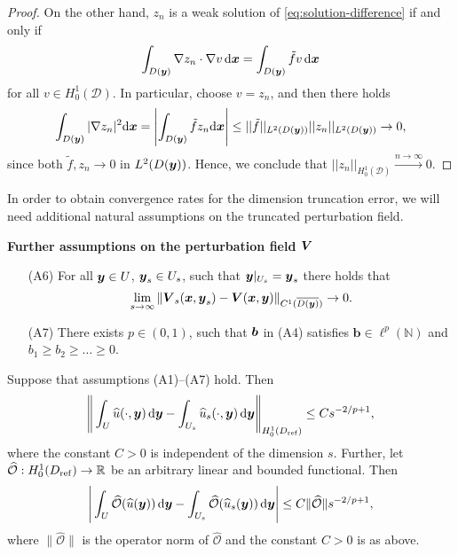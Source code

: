 \documentclass[graybox]{svmult}
\begin{document}
\begin{proof}
    On the other hand, $z_n$ is a weak solution of \eqref{eq:solution-difference} if and only if
    $$
        \int_{D({\boldsymbol{y}})} \nabla z_n\cdot \nabla v \,{\rm d}{\boldsymbol{x}}= \int_{D({\boldsymbol{y}})} \tilde{f} v\,{\rm d}{\boldsymbol{x}}
    $$
    for all $v \in H_0^1(\mathscr D)$. In particular, choose $v = z_n$, and then there holds
    $$
        \int_{D({\boldsymbol{y}})} |\nabla z_n|^2 {\rm d}{\boldsymbol{x}} = \left| \int_{D({\boldsymbol{y}})} \tilde{f} z_n {\rm d}{\boldsymbol{x}} \right|  \leq || \tilde{f} ||_{L^2(D({\boldsymbol{y}}))} || z_n ||_{L^2(D({\boldsymbol{y}}))} \to 0,
    $$
    since both $\tilde{f}, z_n \to 0$ in $L^2(D({\boldsymbol{y}}))$. Hence, we conclude that $||z_n||_{H_0^1(\mathscr D)} \xrightarrow[]{n \to \infty} 0$.
\end{proof}

In order to obtain convergence rates for the dimension truncation error, we will need additional natural assumptions on the truncated perturbation field. 

\bigskip

\noindent\begin{minipage}{\textwidth} \textbf{Further assumptions on the perturbation field ${\boldsymbol{V}}$}

\begin{addmargin}[1.3em]{0em}
\begin{enumerate}
    \item[(A6)] \label{a6} For all ${\boldsymbol{y}} \in U$, ${\boldsymbol{y}}_s \in U_s$, such that ${\boldsymbol{y}}|_{U_s} = {\boldsymbol{y}}_s$ there holds that
    \begin{equation*}
        \lim_{s \to \infty}\| {\boldsymbol{V}}_s({\boldsymbol{x}}, {\boldsymbol{y}}_s) - {\boldsymbol{V}}({\boldsymbol{x}}, {\boldsymbol{y}}) \|_{C^1(\overline{D({\boldsymbol{y}})})} \to 0.
    \end{equation*}
    \item[(A7)] There exists $p\in(0,1)$, such that  ${\boldsymbol{b}}$ in (A4) satisfies $\boldsymbol b\in\ell^p(\mathbb N)$ and $b_1\geq b_2\geq \dots \geq 0$.\label{a7}
\end{enumerate}
\end{addmargin}\end{minipage}

\begin{theorem}
    \label{thm: dimension-truncation}
    Suppose that assumptions {\rm (A1)--(A7)} hold. 
    Then
    $$
        \Bigg\| \int_{U} \widehat u(\cdot, \boldsymbol{y})\,{\rm d}\boldsymbol{y} - \int_{U_s} \widehat u_s(\cdot, {\boldsymbol{y}})\,{\rm d}{\boldsymbol{y}} \Bigg\|_{H_0^1(D_{\rm ref})} \leq C s^{-2/p+1},
    $$
    where the constant $C > 0$ is independent of the dimension $s$. Further, let $\widehat{\mathcal{O}}: H_0^1(D_{\rm ref}) \to \mathbb{R}$ be an arbitrary linear and bounded functional. Then 
    $$
        \Bigg| \int_{U} \widehat{\mathcal{O}}(\widehat u(\boldsymbol{y}))\,{\rm d}\boldsymbol{y} - \int_{U_s} \widehat{\mathcal{O}}(\widehat u_s(\boldsymbol{y}))\,{\rm d}\boldsymbol{y} \Bigg| \leq C \|\widehat{\mathcal{O}}\| s^{-2/p+1},
    $$
    where $\| \widehat{\mathcal{O}} \|$ is the operator norm of $\widehat{\mathcal{O}}$ and the constant $C > 0$ is as above.
\end{theorem}
\end{document}
